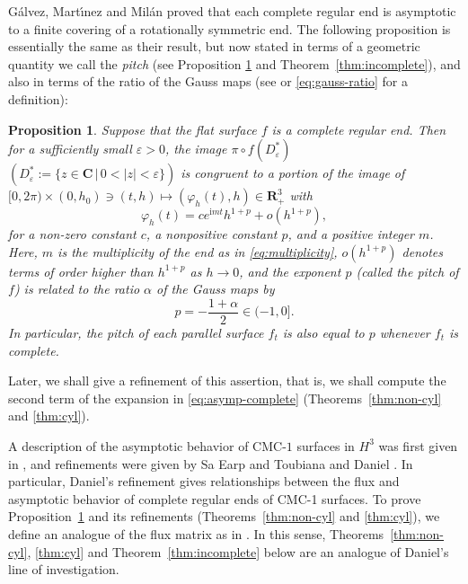 \documentclass[a4paper]{amsart}
\theoremstyle{plain}
\newtheorem{introproposition}[introtheorem]{Proposition}
\theoremstyle{remark}
\numberwithin{equation}{section}
\begin{document}
G\'alvez, Mart\'\i{}nez and Mil\'an \cite{GMM} proved that
each complete regular end is asymptotic to a finite 
covering of a rotationally symmetric end.
The following proposition is essentially the same as
their result, but now stated in terms of a geometric quantity 
we call the {\it pitch} 
(see Proposition \ref{fact:complete-asymptotic} 
and Theorem~\ref{thm:incomplete}), 
and also in terms of the ratio of the Gauss maps 
(see \cite{KRUY} or \eqref{eq:gauss-ratio} for a definition):
\begin{introproposition}\label{fact:complete-asymptotic}
 Suppose that the flat surface  $f$ is a complete regular end.
 Then for a sufficiently small $\varepsilon>0$, 
 the image 
$\pi\circ f(D^*_\varepsilon)$
$(D^*_\varepsilon :=  \{z\in{\boldsymbol{C}}\,|\,0<|z|<\varepsilon\})$
 is congruent to a portion of the image of 
 $[0,2\pi) \times (0,h_0) \ni(t,h)\mapsto (\varphi_h(t),h)\in {\boldsymbol{R}}_+^3$ 
 with
 \begin{equation}\label{eq:asymp-complete}
      \varphi_h(t)=c e^{{\mathrm{i}} mt}h^{1+p}+o(h^{1+p}),
 \end{equation}
 for a non-zero constant $c$, a nonpositive constant $p$, 
 and a positive integer $m$.
 Here, 
 $m$ is the multiplicity of the end  as in  \eqref{eq:multiplicity},
 $o(h^{1+p})$ denotes terms of order higher than $h^{1+p}$
 as $h\to 0$, 
 and the exponent $p$ {\rm (}called the {\em pitch\/} of $f${\rm )}
 is related to the ratio $\alpha$ of the Gauss maps  
  by
 \[
     p=-\frac{1+\alpha}2 \in (-1,0].
 \]
 In particular, 
 the pitch of each parallel surface $f_t$ is  also equal to $p$ whenever
 $f_t$ is complete. 
\end{introproposition}

Later, we shall give a refinement of this assertion, 
that is,  we shall compute the second term of the expansion 
in \eqref{eq:asymp-complete} 
(Theorems~\ref{thm:non-cyl} and \ref{thm:cyl}).

A description of the asymptotic behavior of CMC-$1$ surfaces in $H^3$
was first given in \cite{UY}, 
and refinements were given by Sa Earp and Toubiana \cite{ET}
and Daniel \cite{D}.
In particular, Daniel's refinement gives relationships
between the flux and asymptotic behavior of complete regular ends of 
CMC-1 surfaces.  
To prove Proposition~\ref{fact:complete-asymptotic} 
and its refinements (Theorems~\ref{thm:non-cyl} and \ref{thm:cyl}), 
we define an analogue of the flux matrix as in \cite{RUY}.  
In this sense, 
Theorems~\ref{thm:non-cyl}, \ref{thm:cyl} and
Theorem~\ref{thm:incomplete} below are an analogue of Daniel's line of
investigation. 
\end{document}
